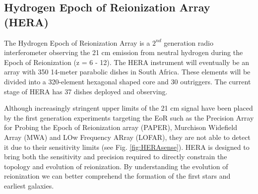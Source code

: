 \documentclass[a0,landscape]{a0poster}
\begin{document}
\begin{multicols}{4}

\section*{Hydrogen Epoch of Reionization Array (HERA)}

The Hydrogen Epoch of Reionization Array is a $2^{nd}$ generation radio interferometer observing the 21 cm emission from neutral hydrogen during the Epoch of Reionization (z = 6 - 12). The HERA instrument will eventually be an array with 350 14-meter parabolic dishes in South Africa. These elements will be divided into a 320-element hexagonal shaped core and 30 outriggers. The current stage of HERA has 37 dishes deployed and observing. 

Although increasingly stringent upper limits of the 21 cm signal have been placed by the first generation experiments targeting the EoR such as the Precision Array for Probing the Epoch of Reionization array (PAPER), Murchison Widefield Array (MWA) and LOw Frequency ARray (LOFAR), they are not able to detect it due to their sensitivity limits (see Fig. \ref{fig:HERAsense}). HERA is designed to bring both the sensitivity and precision required to directly constrain the topology and evolution of reionization. By understanding the evolution of reionization we can better comprehend the formation of the first stars and earliest galaxies.\\


\end{multicols}
\end{document}
